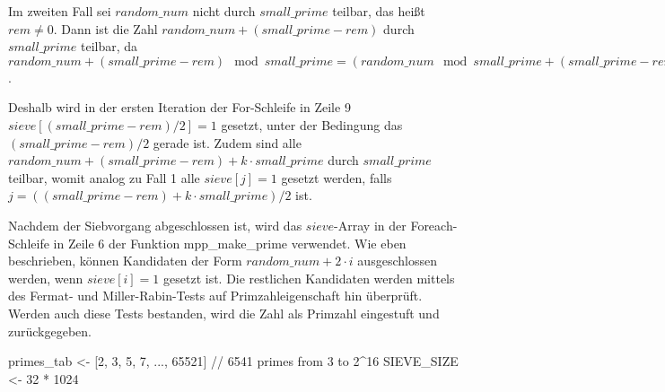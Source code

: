 Im zweiten Fall sei $random\_num$ nicht durch $small\_prime$ teilbar, das heißt $rem \neq 0$.
Dann ist die Zahl $random\_num + (small\_prime - rem)$ durch $small\_prime$ teilbar, da $random\_num + (small\_prime - rem) \mod small\_prime = (random\_num \mod small\_prime + (small\_prime - rem)) \mod small\_prime = (rem + (small\_prime - rem)) = 0$.

Deshalb wird in der ersten Iteration der For-Schleife in Zeile 9 $sieve[(small\_prime - rem)/2] = 1$ gesetzt, unter der Bedingung das $(small\_prime - rem)/2$ gerade ist.
Zudem sind alle $random\_num + (small\_prime - rem) + k \cdot small\_prime$ durch $small\_prime$ teilbar, womit analog zu Fall 1 alle $sieve[j] = 1$ gesetzt werden, falls $j = ((small\_prime - rem) + k \cdot small\_prime) / 2$ ist.



\begin{algorithm}[h]
\DontPrintSemicolon
\caption{Pseudo-Code für mpp_sieve in Mozilla NSS}
\label{alg:sievePrimeGenerationNSS}
\end{algorithm}

Nachdem der Siebvorgang abgeschlossen ist, wird das $sieve$-Array in der Foreach-Schleife in Zeile 6 der Funktion mpp_make_prime verwendet.
Wie eben beschrieben, können Kandidaten der Form $random\_num + 2 \cdot i$ ausgeschlossen werden, wenn $sieve[i] = 1$ gesetzt ist.
Die restlichen Kandidaten werden mittels des Fermat- und Miller-Rabin-Tests auf Primzahleigenschaft hin überprüft.
Werden auch diese Tests bestanden, wird die Zahl als Primzahl eingestuft und zurückgegeben.

\begin{algorithm}[h]
\DontPrintSemicolon
\caption{Pseudo-Code für mpp_make_prime in Mozilla NSS}
\label{alg:makePrimeGenerationNSS}
primes_tab <- [2, 3, 5, 7, ..., 65521] // 6541 primes from 3 to 2^16\;
SIEVE_SIZE <- 32 * 1024\;

\end{algorithm}

